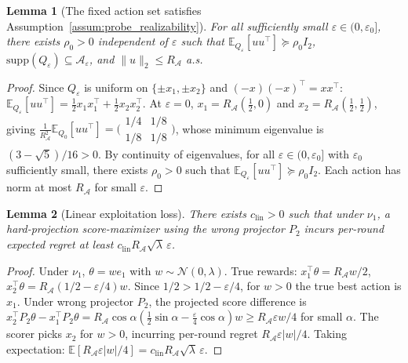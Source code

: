 \documentclass[11pt]{article}
\newcommand{\E}{\mathbb{E}}
\newcommand{\cA}{\mathcal{A}}
\newcommand{\supp}{\mathrm{supp}}
\newtheorem{lemma}{Lemma}
\begin{document}
\begin{lemma}[The fixed action set satisfies Assumption~\ref{assum:probe_realizability}]
\label{lem:hp_probe_realizability}
For all sufficiently small $\varepsilon \in (0, \varepsilon_0]$, there exists $\rho_0 > 0$
independent of $\varepsilon$ such that $\E_{Q_\varepsilon}[uu^\top] \succeq \rho_0 I_2$,
$\supp(Q_\varepsilon) \subseteq \cA_\varepsilon$, and $\|u\|_2 \le R_{\cA}$ a.s.
\end{lemma}

\begin{proof}
Since $Q_\varepsilon$ is uniform on $\{\pm x_1, \pm x_2\}$ and $(-x)(-x)^\top = xx^\top$:
$\E_{Q_\varepsilon}[uu^\top] = \frac{1}{2}x_1 x_1^\top + \frac{1}{2}x_2 x_2^\top$.
At $\varepsilon = 0$, $x_1 = R_{\cA}(\frac{1}{2}, 0)$ and $x_2 = R_{\cA}(\frac{1}{2}, \frac{1}{2})$, giving
$\frac{1}{R_{\cA}^2}\E_{Q_0}[uu^\top]
= \bigl(\begin{smallmatrix} 1/4 & 1/8 \\ 1/8 & 1/8 \end{smallmatrix}\bigr)$,
whose minimum eigenvalue is $(3-\sqrt{5})/16 > 0$.
By continuity of eigenvalues, for all $\varepsilon \in (0, \varepsilon_0]$ with $\varepsilon_0$
sufficiently small, there exists $\rho_0 > 0$ such that
$\E_{Q_\varepsilon}[uu^\top] \succeq \rho_0 I_2$.
Each action has norm at most $R_{\cA}$ for small $\varepsilon$.
\end{proof}

\begin{lemma}[Linear exploitation loss]
\label{lem:hp_linear_loss}
There exists $c_{\mathrm{lin}}>0$ such that under $\nu_1$, a hard-projection
score-maximizer using the wrong projector $P_2$ incurs per-round expected regret
at least $c_{\mathrm{lin}}R_{\cA}\sqrt{\lambda}\,\varepsilon$.
\end{lemma}

\begin{proof}
Under $\nu_1$, $\theta=we_1$ with $w\sim\mathcal{N}(0,\lambda)$.
True rewards: $x_1^\top\theta=R_{\cA}w/2$,
$x_2^\top\theta=R_{\cA}(1/2{-}\varepsilon/4)w$.
Since $1/2>1/2{-}\varepsilon/4$, for $w>0$ the true best action is $x_1$.
Under wrong projector $P_2$, the projected score difference is
$x_2^\top P_2\theta-x_1^\top P_2\theta
= R_{\cA}\cos\alpha(\frac{1}{2}\sin\alpha-\frac{\varepsilon}{4}\cos\alpha)w
\ge R_{\cA}\varepsilon w/4$ for small $\alpha$.
The scorer picks $x_2$ for $w>0$, incurring per-round regret
$R_{\cA}\varepsilon|w|/4$.
Taking expectation:
$\E[R_{\cA}\varepsilon|w|/4]=c_{\mathrm{lin}}R_{\cA}\sqrt{\lambda}\,\varepsilon$.
\end{proof}
\end{document}
